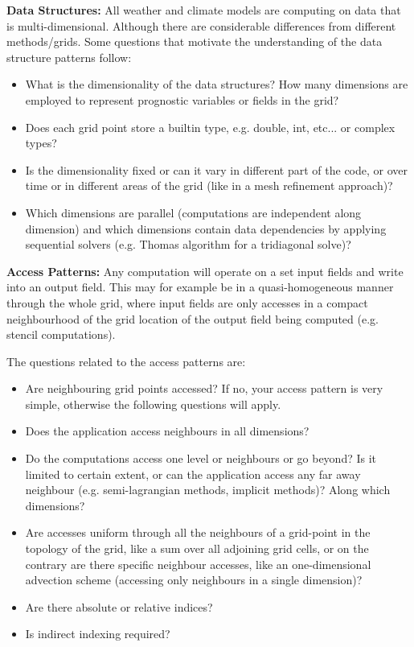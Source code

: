 \documentclass[a4paper,10pt]{scrartcl}
\begin{document}
\textbf{Data Structures:}\newline
All weather and climate models are computing on data that is multi-dimensional. Although there are considerable differences
from different methods/grids. Some questions that motivate the understanding of the data structure patterns follow:
\begin{itemize}
	\item What is the dimensionality of the data structures? How many dimensions are employed to represent prognostic variables or fields in the grid?
	\item Does each grid point store a builtin type, e.g. double, int, etc... or complex types?
	\item Is the dimensionality fixed or can it vary in different part of the code, or over time or in different areas of the grid (like in a mesh refinement approach)? 
	  \item Which dimensions are parallel (computations are independent along dimension) and which dimensions contain data dependencies by applying sequential solvers (e.g. Thomas algorithm for a tridiagonal solve)?
\end{itemize}

\textbf{Access Patterns:}\newline
Any computation will operate on a set input fields and write into an output field. This may for example be in a quasi-homogeneous manner through the whole grid, where input fields are only accesses in a compact neighbourhood of the grid location
of the output field being computed (e.g. stencil computations).

The questions related to the access patterns are:
\begin{itemize} 
  \item Are neighbouring grid points accessed? If no, your access pattern is very simple, otherwise the following
  questions will apply.
  \item Does the application access neighbours in all dimensions? 
  \item Do the computations access one level or neighbours or go beyond? Is it limited to certain extent, or can
  the application access any far away neighbour (e.g. semi-lagrangian methods, implicit methods)? Along which dimensions?
  \item Are accesses uniform through all the neighbours of a grid-point in the topology of the grid,
        like a sum over all adjoining grid cells,
	or on the contrary are there specific neighbour accesses, like an one-dimensional advection scheme (accessing only neighbours in a single dimension)?
  \item Are there absolute or relative indices?
  \item Is indirect indexing required?
\end{itemize}
\end{document}
